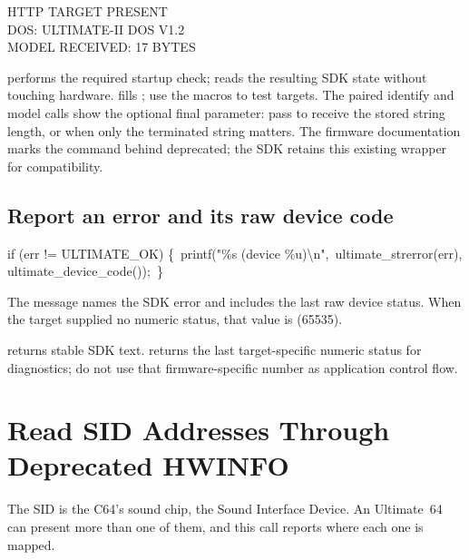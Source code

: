\begin{outputbox}
HTTP TARGET PRESENT\\
DOS: ULTIMATE-II DOS V1.2\\
MODEL RECEIVED: 17 BYTES
\end{outputbox}

 performs the required startup check;
 reads the resulting SDK state without touching
hardware.  fills ; use the
 macros to test targets. The paired identify and model
calls show the optional final parameter: pass  to receive the
stored string length, or  when only the terminated string matters.
The firmware documentation marks the command behind
 deprecated; the SDK retains this existing wrapper
for compatibility.

\subsection*{Report an error and its raw device code}

\begin{listingbox}
if (err != ULTIMATE\_OK) \{\
\hspace*{1em}printf("\%s (device \%u)\textbackslash n",\
\hspace*{2em}ultimate\_strerror(err), ultimate\_device\_code());\
\}
\end{listingbox}

\begin{resultbox}
The message names the SDK error and includes the last raw device status.
When the target supplied no numeric status, that value is
 (65535).
\end{resultbox}

 returns stable SDK text.
 returns the last target-specific numeric status
for diagnostics; do not use that firmware-specific number as application
control flow.


\Needspace{32\baselineskip}
\section{Read SID Addresses Through Deprecated HWINFO}

The SID is the C64's sound chip, the Sound Interface Device. An Ultimate~64
can present more than one of them, and this call reports where each one is
mapped.

